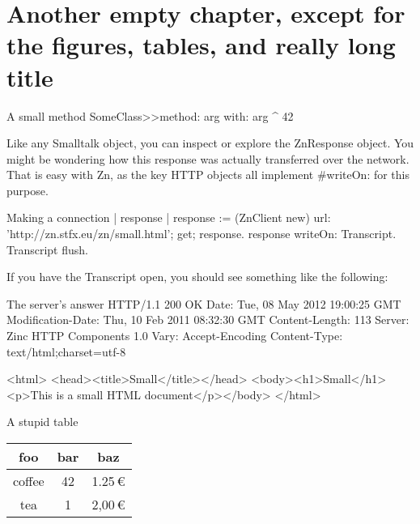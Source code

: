 \documentclass[
    10pt,
    twoside,
    smallroyalvopaper,
]{memoir}
\begin{document}
\chapter{Another empty chapter, except for the figures, tables, and really long title}

\begin{leftbar}
    \lipsum[2]
\end{leftbar}

\begin{script}[fortytwo]{A small method}
SomeClass>>method: arg with: arg
    ^ 42
\end{script}

Like any Smalltalk object, you can inspect or explore the ZnResponse object. You might be wondering how this response was actually transferred over the network. That is easy with Zn, as the key HTTP objects all implement \#writeOn: for this purpose.

\begin{script}{Making a connection}
| response |
response := (ZnClient new)
  url: 'http://zn.stfx.eu/zn/small.html';
  get;
  response.
response writeOn: Transcript.
Transcript flush.
\end{script}

If you have the Transcript open, you should see something like the following:

\begin{script}{The server's answer}
HTTP/1.1 200 OK
Date: Tue, 08 May 2012 19:00:25 GMT
Modification-Date: Thu, 10 Feb 2011 08:32:30 GMT
Content-Length: 113
Server: Zinc HTTP Components 1.0
Vary: Accept-Encoding
Content-Type: text/html;charset=utf-8

<html>
<head><title>Small</title></head>
<body><h1>Small</h1><p>This is a small HTML document</p></body>
</html>
\end{script}

\begin{table}[p]
    \begin{sidecaption}{A stupid table}
        \begin{tabular}{ccc}
            \toprule
            foo & bar & baz \\
            \midrule
            coffee & 42 & 1.25\,€ \\
            tea & 1 & 2,00\,€ \\
            \bottomrule
        \end{tabular}
    \end{sidecaption}
\end{table}
\end{document}

